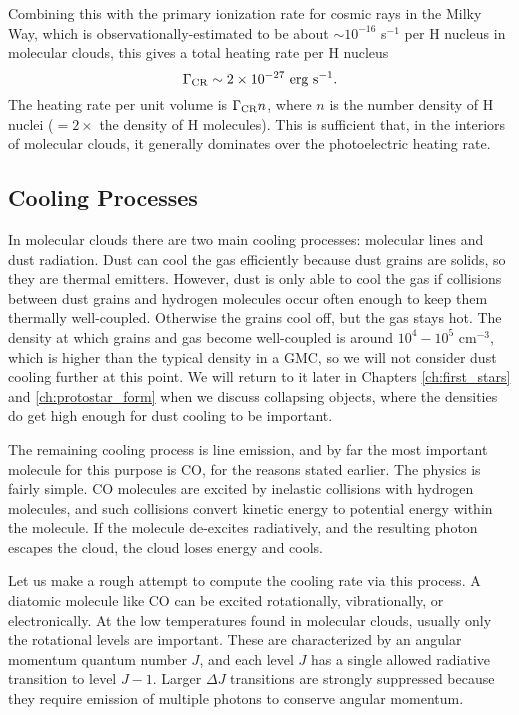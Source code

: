 Combining this with the primary ionization rate for cosmic rays in the Milky Way, which is observationally-estimated to be about  $\sim 10^{-16}$ s$^{-1}$ per H nucleus in molecular clouds, this gives a total heating rate per H nucleus
\begin{equation}
\Gamma_{\rm CR} \sim 2\times 10^{-27}\mbox{ erg s}^{-1}.
\end{equation}
The heating rate per unit volume is $\Gamma_{\rm CR} n$, where $n$ is the number density of H nuclei ($=2\times$ the density of H molecules). This is sufficient that, in the interiors of molecular clouds, it generally dominates over the photoelectric heating rate.

\subsection{Cooling Processes}

In molecular clouds there are two main cooling processes: molecular lines and dust radiation. Dust can cool the gas efficiently because dust grains are solids, so they are thermal emitters. However, dust is only able to cool the gas if collisions between dust grains and hydrogen molecules occur often enough to keep them thermally well-coupled. Otherwise the grains cool off, but the gas stays hot. The density at which grains and gas become well-coupled is around $10^4-10^5$ cm$^{-3}$, which is higher than the typical density in a GMC, so we will not consider dust cooling further at this point. We will return to it later in Chapters \ref{ch:first_stars} and \ref{ch:protostar_form} when we discuss collapsing objects, where the densities do get high enough for dust cooling to be important.

The remaining cooling process is line emission, and by far the most important molecule for this purpose is CO, for the reasons stated earlier. The physics is fairly simple. CO molecules are excited by inelastic collisions with hydrogen molecules, and such collisions convert kinetic energy to potential energy within the molecule. If the molecule de-excites radiatively, and the resulting photon escapes the cloud, the cloud loses energy and cools.

Let us make a rough attempt to compute the cooling rate via this process. A diatomic molecule like CO can be excited rotationally, vibrationally, or electronically. At the low temperatures found in molecular clouds, usually only the rotational levels are important. These are characterized by an angular momentum quantum number $J$, and each level $J$ has a single allowed radiative transition to level $J-1$. Larger $\Delta J$ transitions are strongly suppressed because they require emission of multiple photons to conserve angular momentum.

